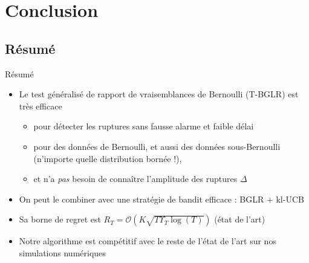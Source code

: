 \documentclass[11pt,french,ignorenonframetext,]{beamer}
\providecommand{\tightlist}{%
  \setlength{\itemsep}{0pt}\setlength{\parskip}{0pt}}
\begin{document}






\section{\hfill{}Conclusion\hfill{}}
\subsection{Résumé}

\begin{frame}{Résumé}

  \begin{itemize}
    \item
    Le test généralisé de rapport de vraisemblances de Bernoulli (T-BGLR) est très efficace \dCooley{}
    \begin{itemize}\tightlist
      \item
      pour détecter les ruptures \alert{sans fausse alarme} et \alert{faible délai}
      \item
      pour des données de Bernoulli, et aussi des données sous-Bernoulli (n'importe quelle distribution bornée !),
      \item
      et n'a \emph{pas} besoin de connaître l'amplitude des ruptures $\Delta$
    \end{itemize}
    \item
    On peut le combiner avec une stratégie de bandit efficace :
    \alert{BGLR + kl-UCB}  \dCooley{}
    \item
    Sa borne de regret est $R_T = \mathcal{O}(K \sqrt{T \Upsilon_T \log(T)})$  \dCooley{} (état de l'art)
    \item
    Notre algorithme est compétitif avec le reste de l'état de l'art sur nos simulations numériques \dCooley{}
  \end{itemize}

\end{frame}
\end{document}
